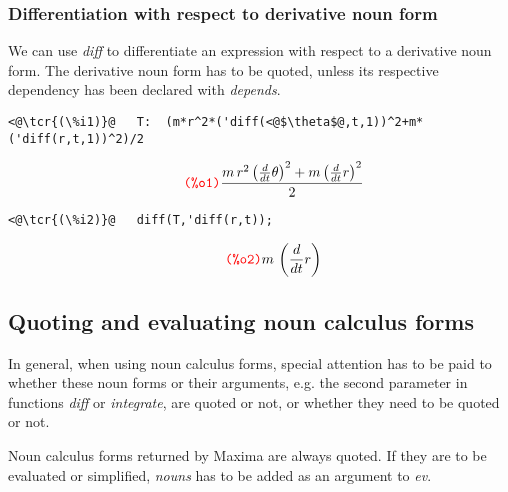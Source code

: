 \documentclass[../Maxima_Workbook.tex]{subfiles}
\begin{document}
\subsubsection{Differentiation with respect to derivative noun form}\label{D2}

We can use \emph{diff} to differentiate an expression with respect to a derivative noun form. The derivative noun form has to be quoted, unless its respective dependency has been declared with \emph{depends}.

\lz \begin{small}
\color{blue} \leqn
\begin{lstlisting}
<@\tcr{(\%i1)}@   T:  (m*r^2*('diff(<@$\theta$@,t,1))^2+m*('diff(r,t,1))^2)/2
\end{lstlisting}
\vspace{-4mm} \[\tag*{\tcr{\ttfamily (\%o1)}} \frac{m\, {{r}^{2}}\, {{\left( \frac{d}{d t} \theta \right) }^{2}}+m\, {{\left( \frac{d}{d t} r\right) }^{2}}}{2} \]
\vspace{-7mm} \begin{lstlisting}
<@\tcr{(\%i2)}@   diff(T,'diff(r,t));
\end{lstlisting}
\vspace{-5mm} \[\tag*{\tcr{\ttfamily (\%o2)}} m\, \left( \frac{d}{d t} r\right)  \]
\color{black} \reqn
\end{small} \vspace{-4mm}

\subsection{Quoting and evaluating noun calculus forms}

In general, when using noun calculus forms, special attention has to be paid to whether these noun forms or their arguments, e.g. the second parameter in functions \emph{diff} or \emph{integrate}, are quoted or not, or whether they need to be quoted or not. 

\lz Noun calculus forms returned by Maxima are always quoted. If they are to be evaluated or simplified, \emph{nouns} has to be added as an argument to \emph{ev}.
\end{document}
